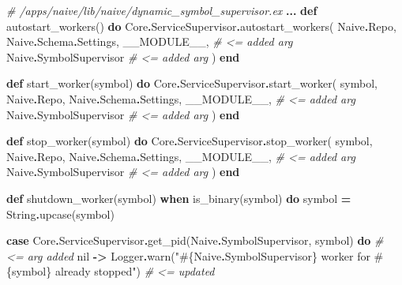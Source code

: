 \documentclass[
]{book}
\newenvironment{Shaded}{\begin{snugshade}}{\end{snugshade}}
\newcommand{\CommentTok}[1]{\textcolor[rgb]{0.56,0.35,0.01}{\textit{#1}}}
\newcommand{\ConstantTok}[1]{\textcolor[rgb]{0.00,0.00,0.00}{#1}}
\newcommand{\KeywordTok}[1]{\textcolor[rgb]{0.13,0.29,0.53}{\textbf{#1}}}
\newcommand{\NormalTok}[1]{#1}
\newcommand{\OperatorTok}[1]{\textcolor[rgb]{0.81,0.36,0.00}{\textbf{#1}}}
\newcommand{\OtherTok}[1]{\textcolor[rgb]{0.56,0.35,0.01}{#1}}
\newcommand{\StringTok}[1]{\textcolor[rgb]{0.31,0.60,0.02}{#1}}
\begin{document}
\begin{Shaded}
\begin{Highlighting}[]
  \CommentTok{\# /apps/naive/lib/naive/dynamic\_symbol\_supervisor.ex}
  \OperatorTok{...}
  \KeywordTok{def}\NormalTok{ autostart\_workers() }\KeywordTok{do}
    \ConstantTok{Core}\OperatorTok{.}\ConstantTok{ServiceSupervisor}\OperatorTok{.}\NormalTok{autostart\_workers(}
      \ConstantTok{Naive}\OperatorTok{.}\ConstantTok{Repo}\NormalTok{,}
      \ConstantTok{Naive}\OperatorTok{.}\ConstantTok{Schema}\OperatorTok{.}\ConstantTok{Settings}\NormalTok{,}
      \ConstantTok{\_\_MODULE\_\_}\NormalTok{,             }\CommentTok{\# \textless{}= added arg}
      \ConstantTok{Naive}\OperatorTok{.}\ConstantTok{SymbolSupervisor}  \CommentTok{\# \textless{}= added arg}
\NormalTok{    )}
  \KeywordTok{end}

  \KeywordTok{def}\NormalTok{ start\_worker(symbol) }\KeywordTok{do}
    \ConstantTok{Core}\OperatorTok{.}\ConstantTok{ServiceSupervisor}\OperatorTok{.}\NormalTok{start\_worker(}
\NormalTok{      symbol,}
      \ConstantTok{Naive}\OperatorTok{.}\ConstantTok{Repo}\NormalTok{,}
      \ConstantTok{Naive}\OperatorTok{.}\ConstantTok{Schema}\OperatorTok{.}\ConstantTok{Settings}\NormalTok{,}
      \ConstantTok{\_\_MODULE\_\_}\NormalTok{,             }\CommentTok{\# \textless{}= added arg}
      \ConstantTok{Naive}\OperatorTok{.}\ConstantTok{SymbolSupervisor}  \CommentTok{\# \textless{}= added arg}
\NormalTok{    )}
  \KeywordTok{end}

  \KeywordTok{def}\NormalTok{ stop\_worker(symbol) }\KeywordTok{do}
    \ConstantTok{Core}\OperatorTok{.}\ConstantTok{ServiceSupervisor}\OperatorTok{.}\NormalTok{stop\_worker(}
\NormalTok{      symbol,}
      \ConstantTok{Naive}\OperatorTok{.}\ConstantTok{Repo}\NormalTok{,}
      \ConstantTok{Naive}\OperatorTok{.}\ConstantTok{Schema}\OperatorTok{.}\ConstantTok{Settings}\NormalTok{,}
      \ConstantTok{\_\_MODULE\_\_}\NormalTok{,             }\CommentTok{\# \textless{}= added arg}
      \ConstantTok{Naive}\OperatorTok{.}\ConstantTok{SymbolSupervisor}  \CommentTok{\# \textless{}= added arg}
\NormalTok{    )}
  \KeywordTok{end}

  \KeywordTok{def}\NormalTok{ shutdown\_worker(symbol) }\KeywordTok{when}\NormalTok{ is\_binary(symbol) }\KeywordTok{do}
\NormalTok{    symbol }\OperatorTok{=} \ConstantTok{String}\OperatorTok{.}\NormalTok{upcase(symbol)}

    \KeywordTok{case} \ConstantTok{Core}\OperatorTok{.}\ConstantTok{ServiceSupervisor}\OperatorTok{.}\NormalTok{get\_pid(}\ConstantTok{Naive}\OperatorTok{.}\ConstantTok{SymbolSupervisor}\NormalTok{, symbol) }\KeywordTok{do} \CommentTok{\# \textless{}= arg added}
      \ConstantTok{nil} \OperatorTok{{-}\textgreater{}}
        \ConstantTok{Logger}\OperatorTok{.}\NormalTok{warn(}\StringTok{"}\OtherTok{\#\{}\ConstantTok{Naive}\OperatorTok{.}\ConstantTok{SymbolSupervisor}\OtherTok{\}}\StringTok{ worker for }\OtherTok{\#\{}\NormalTok{symbol}\OtherTok{\}}\StringTok{ already stopped"}\NormalTok{) }\CommentTok{\# \textless{}= updated}


\end{Highlighting}
\end{Shaded}
\end{document}
